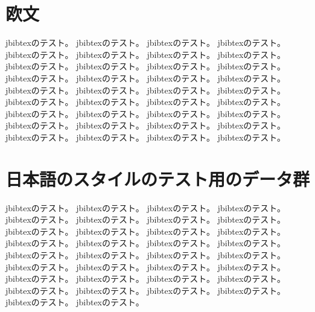 \documentclass{ujarticle}
\begin{document}
\section{欧文}

jbibtexのテスト\cite{article-minimal}。
jbibtexのテスト\cite{article-full}。
jbibtexのテスト\cite{article-crossref}。
jbibtexのテスト\cite{whole-journal}。
jbibtexのテスト\cite{inbook-minimal}。
jbibtexのテスト\cite{inbook-full}。
jbibtexのテスト\cite{inbook-crossref}。
jbibtexのテスト\cite{book-minimal}。
jbibtexのテスト\cite{book-full}。
jbibtexのテスト\cite{book-crossref}。
jbibtexのテスト\cite{whole-set}。
jbibtexのテスト\cite{booklet-minimal}。
jbibtexのテスト\cite{booklet-full}。
jbibtexのテスト\cite{incollection-minimal}。
jbibtexのテスト\cite{incollection-full}。
jbibtexのテスト\cite{incollection-crossref}。
jbibtexのテスト\cite{whole-collection}。
jbibtexのテスト\cite{manual-minimal}。
jbibtexのテスト\cite{manual-full}。
jbibtexのテスト\cite{mastersthesis-minimal}。
jbibtexのテスト\cite{mastersthesis-full}。
jbibtexのテスト\cite{misc-minimal}。
jbibtexのテスト\cite{misc-full}。
jbibtexのテスト\cite{inproceedings-minimal}。
jbibtexのテスト\cite{inproceedings-full}。
jbibtexのテスト\cite{inproceedings-crossref}。
jbibtexのテスト\cite{proceedings-minimal}。
jbibtexのテスト\cite{proceedings-full}。
jbibtexのテスト\cite{whole-proceedings}。
jbibtexのテスト\cite{phdthesis-minimal}。
jbibtexのテスト\cite{phdthesis-full}。
jbibtexのテスト\cite{techreport-minimal}。
jbibtexのテスト\cite{techreport-full}。
jbibtexのテスト\cite{unpublished-minimal}。
jbibtexのテスト\cite{unpublished-full}。
jbibtexのテスト\cite{random-note-crossref}。

\section{日本語のスタイルのテスト用のデータ群}

jbibtexのテスト\cite{inbook-full-j}。
jbibtexのテスト\cite{incol-full-j-1}。
jbibtexのテスト\cite{article-crossref-j}。
jbibtexのテスト\cite{article-crossref-jj}。
jbibtexのテスト\cite{whole-journal-j}。
jbibtexのテスト\cite{inbook-crossref-j}。
jbibtexのテスト\cite{whole-set-j}。
jbibtexのテスト\cite{inbook-crossref-j-1}。
jbibtexのテスト\cite{cvs}。
jbibtexのテスト\cite{ha}。
jbibtexのテスト\cite{costa}。
jbibtexのテスト\cite{mcclella}。
jbibtexのテスト\cite{dug}。
jbibtexのテスト\cite{sakawa}。
jbibtexのテスト\cite{ssl}。
jbibtexのテスト\cite{newman}。
jbibtexのテスト\cite{Rich}。
jbibtexのテスト\cite{goto}。
jbibtexのテスト\cite{磯崎}。
jbibtexのテスト\cite{斉藤}。
jbibtexのテスト\cite{sym}。
jbibtexのテスト\cite{eda}。
jbibtexのテスト\cite{dss}。
jbibtexのテスト\cite{cm}。
jbibtexのテスト\cite{reduce}。
jbibtexのテスト\cite{fp}。
jbibtexのテスト\cite{la}。
jbibtexのテスト\cite{あふれ無し}。
jbibtexのテスト\cite{ダム}。
jbibtexのテスト\cite{人名表記}。
jbibtexのテスト\cite{EUC日本語TeX}。
jbibtexのテスト\cite{multi}。
jbibtexのテスト\cite{marumoji}。
jbibtexのテスト\cite{maru}。
\end{document}
